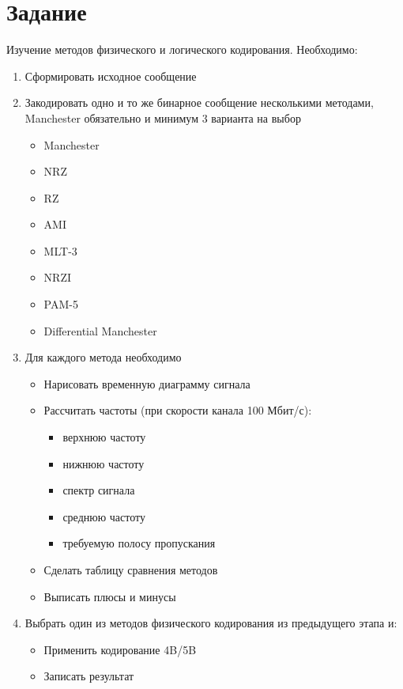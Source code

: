 \documentclass[12pt,a4paper]{report}
\begin{document}
\section*{Задание}
Изучение методов физического и логического кодирования. Необходимо:
\begin{enumerate}
    \item Сформировать исходное сообщение
    \item Закодировать одно и то же бинарное сообщение несколькими методами, Manchester обязательно и минимум 3 варианта на выбор
    \begin{itemize}
        \item Manchester
        \item NRZ
        \item RZ
        \item AMI
        \item MLT-3
        \item NRZI
        \item PAM-5
        \item Differential Manchester
    \end{itemize}
    \item Для каждого метода необходимо
    \begin{itemize}
        \item Нарисовать временную диаграмму сигнала
        \item Рассчитать частоты (при скорости канала 100 Мбит/с):
        \begin{itemize}
            \item верхнюю частоту
            \item нижнюю частоту
            \item спектр сигнала
            \item среднюю частоту
            \item требуемую полосу пропускания
        \end{itemize}
        \item Сделать таблицу сравнения методов
        \item Выписать плюсы и минусы
    \end{itemize}
    \item Выбрать один из методов физического кодирования из предыдущего этапа и:
    \begin{itemize}
        \item Применить кодирование 4B/5B
        \item Записать результат
        \begin{itemize}

\end{itemize}
\end{itemize}
\end{enumerate}
\end{document}
